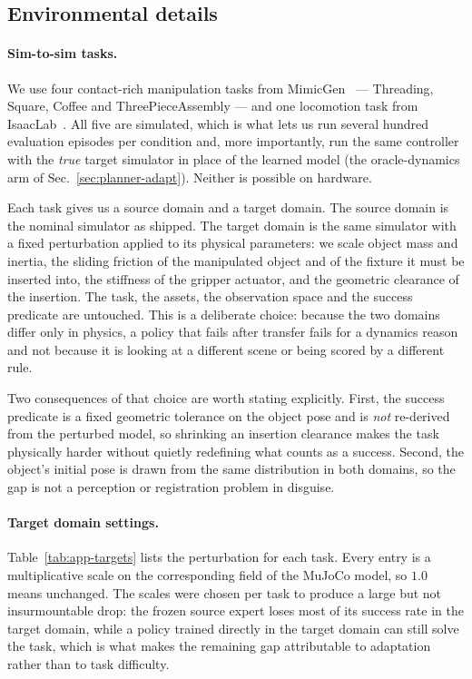 \subsection{Environmental details}
\label{app:env}

\paragraph{Sim-to-sim tasks.}
We use four contact-rich manipulation tasks from MimicGen~\citep{mandlekar2023mimicgen}
--- Threading, Square, Coffee and ThreePieceAssembly --- and one locomotion task
from IsaacLab~\citep{mittal2023orbit}. All five are simulated, which is what lets
us run several hundred evaluation episodes per condition and, more importantly,
run the same controller with the \emph{true} target simulator in place of the
learned model (the oracle-dynamics arm of Sec.~\ref{sec:planner-adapt}). Neither
is possible on hardware.

Each task gives us a source domain and a target domain. The source domain is the
nominal simulator as shipped. The target domain is the same simulator with a
fixed perturbation applied to its physical parameters: we scale object mass and
inertia, the sliding friction of the manipulated object and of the fixture it
must be inserted into, the stiffness of the gripper actuator, and the geometric
clearance of the insertion. The task, the assets, the observation space and the
success predicate are untouched. This is a deliberate choice: because the two
domains differ only in physics, a policy that fails after transfer fails for a
dynamics reason and not because it is looking at a different scene or being
scored by a different rule.

Two consequences of that choice are worth stating explicitly. First, the success
predicate is a fixed geometric tolerance on the object pose and is \emph{not}
re-derived from the perturbed model, so shrinking an insertion clearance makes
the task physically harder without quietly redefining what counts as a success.
Second, the object's initial pose is drawn from the same distribution in both
domains, so the gap is not a perception or registration problem in disguise.

\paragraph{Target domain settings.}
Table~\ref{tab:app-targets} lists the perturbation for each task. Every entry is
a multiplicative scale on the corresponding field of the MuJoCo model, so
$1.0$ means unchanged. The scales were chosen per task to produce a large but
not insurmountable drop: the frozen source expert loses most of its success rate
in the target domain, while a policy trained directly in the target domain can
still solve the task, which is what makes the remaining gap attributable to
adaptation rather than to task difficulty.

